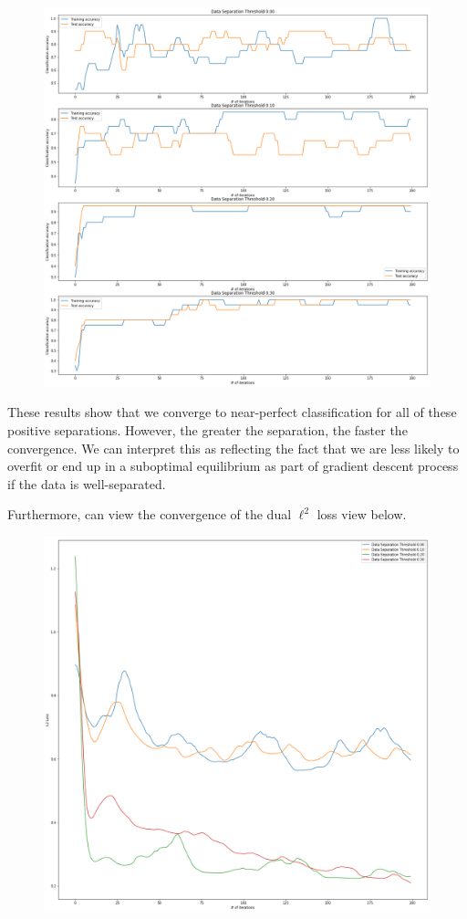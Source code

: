 \documentclass[main.tex]{subfiles}
\begin{document}
\begin{figure}[H]
\includegraphics[width=\textwidth]{images/data_sep}
\end{figure}

These results show that we converge to near-perfect classification for all of these positive separations. However, the greater the separation, the faster the convergence. We can interpret this as reflecting the fact that we are less likely to overfit or end up in a suboptimal equilibrium as part of gradient descent process if the data is well-separated.

Furthermore, can view the convergence of the dual $\ell^2$ loss view below.

\begin{figure}[H]
\includegraphics[width=\textwidth]{images/l2_loss_conv}	
\end{figure}
\end{document}
